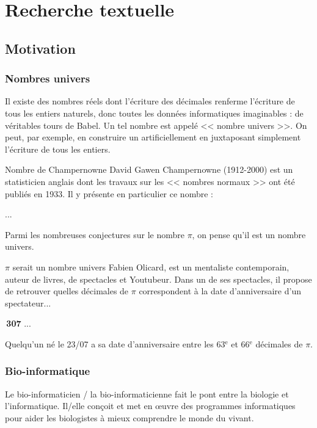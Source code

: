 \documentclass[a4paper,10pt]{report}  %
\newcommand\rubrique{rubrique}
\theoremstyle{exo}
\begin{document}
\renewcommand\rubrique{Algorithmique}
\chapter{Recherche textuelle}

\section{Motivation}

\subsection{Nombres univers}

Il existe des nombres réels dont l'écriture des décimales renferme l'écriture de tous les entiers naturels, donc toutes les données informatiques imaginables : de véritables tours de Babel. Un tel nombre est appelé << nombre univers >>. On peut, par exemple, en construire un artificiellement en juxtaposant simplement l'écriture de tous les entiers.

\begin{exemple*}{Nombre de Champernowne}
David Gawen Champernowne (1912-2000) est un statisticien anglais dont les travaux sur les << nombres normaux >> ont été publiés en 1933. Il y présente en particulier ce nombre :

...
\end{exemple*}

Parmi les nombreuses conjectures sur le nombre $\pi$, on pense qu'il est un nombre univers.

\begin{exemple*}{$\pi$ serait un nombre univers}
Fabien Olicard, est un mentaliste contemporain, auteur de livres, de spectacles et Youtubeur. Dans un de ses spectacles, il propose de retrouver quelles décimales de $\pi$ correspondent à la date d'anniversaire d'un spectateur...

\,{\bfseries307}\,\,...

Quelqu'un né le 23/07 a sa date d'anniversaire entre les 63$^\text{e}$ et 66$^\text{e}$ décimales de $\pi$. 
\end{exemple*}

\subsection{Bio-informatique}
Le bio-informaticien / la bio-informaticienne fait le pont entre la biologie et l'informatique. Il/elle conçoit et met en œuvre des programmes informatiques pour aider les biologistes à mieux comprendre le monde du vivant. 
\end{document}
